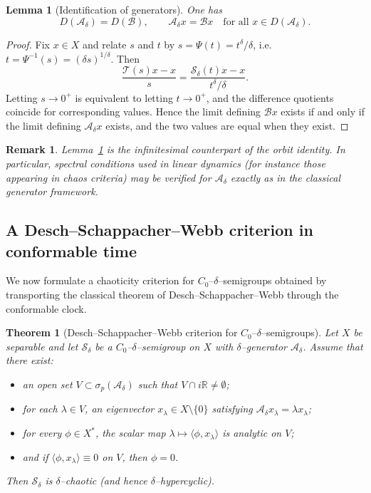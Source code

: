 \documentclass[preprint,12pt]{elsarticle}
\newtheorem{theorem}{Theorem}
\newtheorem{lemma}{Lemma}
\newtheorem{remark}{Remark}
\newtheorem{proof}{Proof}
\newcommand{\R}{\mathbb {R}}
\begin{document}
\begin{lemma}[Identification of generators]\label{lem:generator_identification}
One has
\[
D(\mathcal A_\delta)=D(\mathcal B),
\qquad
\mathcal A_\delta x=\mathcal Bx
\quad\text{for all }x\in D(\mathcal A_\delta).
\]
\end{lemma}

\begin{proof}
Fix $x\in X$ and relate $s$ and $t$ by $s=\Psi(t)=t^\delta/\delta$, i.e.\
$t=\Psi^{-1}(s)=(\delta s)^{1/\delta}$.
Then
\[
\frac{\mathcal T(s)x-x}{s}
=
\frac{\mathcal S_\delta(t)x-x}{t^\delta/\delta}.
\]
Letting $s\to0^+$ is equivalent to letting $t\to0^+$, and the difference quotients
coincide for corresponding values.
Hence the limit defining $\mathcal Bx$ exists if and only if the limit defining
$\mathcal A_\delta x$ exists, and the two values are equal when they exist.
\end{proof}

\begin{remark}\label{rem:generator_dynamics}
Lemma~\ref{lem:generator_identification} is the infinitesimal counterpart of the orbit
identity.
In particular, spectral conditions used in linear dynamics (for instance those appearing
in chaos criteria) may be verified for $\mathcal A_\delta$ exactly as in the classical
generator framework.
\end{remark}

\subsection{A Desch--Schappacher--Webb criterion in conformable time}

We now formulate a chaoticity criterion for $C_0$--$\delta$--semigroups obtained by
transporting the classical theorem of Desch--Schappacher--Webb \cite{desch1997} through
the conformable clock.

\begin{theorem}[Desch--Schappacher--Webb criterion for $C_0$--$\delta$--semigroups]
\label{thm:DSW_delta}
Let $X$ be separable and let $\mathcal S_\delta$ be a $C_0$--$\delta$--semigroup on $X$
with $\delta$--generator $\mathcal A_\delta$.
Assume that there exist:
\begin{itemize}
\item an open set $V\subset\sigma_p(\mathcal A_\delta)$ such that $V\cap i\R\neq\emptyset$;
\item for each $\lambda\in V$, an eigenvector $x_\lambda\in X\setminus\{0\}$ satisfying
$\mathcal A_\delta x_\lambda=\lambda x_\lambda$;
\item for every $\phi\in X^\ast$, the scalar map
\(
\lambda\mapsto \langle \phi, x_\lambda\rangle
\)
is analytic on $V$;
\item and if $\langle \phi, x_\lambda\rangle\equiv 0$ on $V$, then $\phi=0$.
\end{itemize}
Then $\mathcal S_\delta$ is $\delta$--chaotic (and hence $\delta$--hypercyclic).
\end{theorem}
\end{document}
